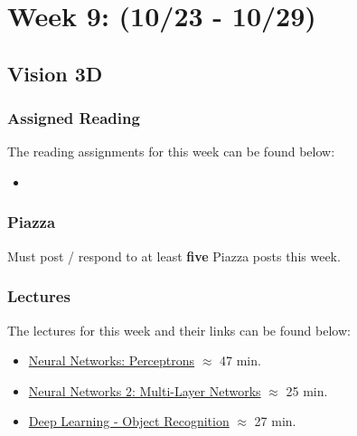 \clearpage
\chapter{Week 9: (10/23 - 10/29)}

\section{Vision 3D}

\subsection{Assigned Reading}

The reading assignments for this week can be found below:

\begin{itemize}
    \item {}
\end{itemize}

\subsection{Piazza}

Must post / respond to at least \textbf{five} Piazza posts this week.  

\subsection{Lectures}

The lectures for this week and their links can be found below:

\begin{itemize}
    \item \href{https://applied.cs.colorado.edu/mod/hvp/view.php?id=49395}{Neural Networks: Perceptrons} $\approx$ 47 min.
    \item \href{https://applied.cs.colorado.edu/mod/hvp/view.php?id=49396}{Neural Networks 2: Multi-Layer Networks} $\approx$ 25 min.
    \item \href{https://applied.cs.colorado.edu/mod/hvp/view.php?id=49397}{Deep Learning - Object Recognition} $\approx$ 27 min.
\end{itemize}


